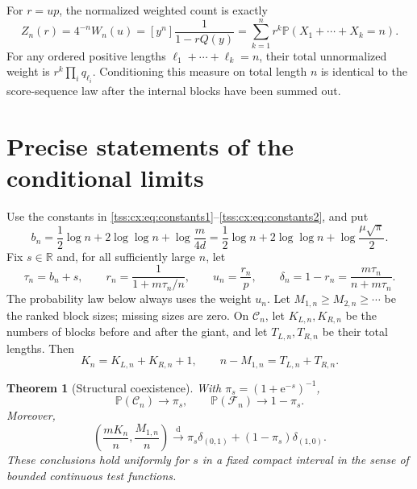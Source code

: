 \documentclass[11pt]{article}
\newtheorem{theorem}{Theorem}[section]
\theoremstyle{remark}\newtheorem{remark}[theorem]{Remark}
\theoremstyle{definition}\newtheorem{definition}[theorem]{Definition}
\newcommand{\e}{\mathrm e}
\newcommand{\Prob}{\mathbb P}
\newcommand{\R}{\mathbb R}
\newcommand{\dto}{\xrightarrow{\mathrm d}}
\newcommand{\Cev}{\mathcal C_n}
\newcommand{\Fev}{\mathcal F_n}
\begin{document}
For $r=up$, the normalized weighted count is exactly
\begin{equation}\label{tss:cx:eq:Z}
 Z_n(r)=4^{-n}W_n(u)
       =[y^n]\frac1{1-rQ(y)}
       =\sum_{k=1}^n r^k\Prob(X_1+\cdots+X_k=n).
\end{equation}
For any ordered positive lengths $\ell_1+\cdots+\ell_k=n$,
their total unnormalized weight is
$r^k\prod_iq_{\ell_i}$. Conditioning this measure on total length
$n$ is identical to the score-sequence law after the internal blocks
have been summed out.

\section{Precise statements of the conditional limits}
\label{tss:cx:sec:main}
Use the constants in \eqref{tss:cx:eq:constants1}--\eqref{tss:cx:eq:constants2}, and put
\begin{equation}\label{tss:cx:eq:center}
 b_n=\frac12\log n+2\log\log n+\log\frac{m}{4d}
     =\frac12\log n+2\log\log n+\log\frac{\mu\sqrt\pi}{2}.
\end{equation}
Fix $s\in\R$ and, for all sufficiently large $n$, let
\begin{equation}\label{tss:cx:eq:rn}
 \tau_n=b_n+s,\qquad
 r_n=\frac1{1+m\tau_n/n},\qquad
 u_n=\frac{r_n}{p},\qquad
 \delta_n=1-r_n=\frac{m\tau_n}{n+m\tau_n}.
\end{equation}
The probability law below always uses the weight $u_n$.
Let $M_{1,n}\ge M_{2,n}\ge\cdots$ be the ranked block sizes;
missing sizes are zero. On $\Cev$, let $K_{L,n},K_{R,n}$ be the numbers
of blocks before and after the giant, and let $T_{L,n},T_{R,n}$ be
their total lengths. Then
\[
 K_n=K_{L,n}+K_{R,n}+1,\qquad
 n-M_{1,n}=T_{L,n}+T_{R,n}.
\]

\begin{theorem}[Structural coexistence]\label{tss:cx:thm:mixture}
With $\pi_s=(1+\e^{-s})^{-1}$,
\begin{equation}\label{tss:cx:eq:phaseprob}
 \Prob(\Cev)\longrightarrow\pi_s,
 \qquad \Prob(\Fev)\longrightarrow1-\pi_s.
\end{equation}
Moreover,
\begin{equation}\label{tss:cx:eq:jointmixture}
 \left(\frac{mK_n}{n},\frac{M_{1,n}}n\right)
 \dto \pi_s\delta_{(0,1)}+(1-\pi_s)\delta_{(1,0)}.
\end{equation}
These conclusions hold uniformly for $s$ in a fixed compact interval
in the sense of bounded continuous test functions.
\end{theorem}
\end{document}
